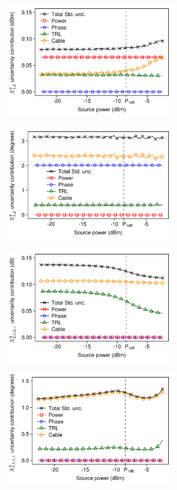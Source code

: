 \documentclass[../thesis/thesis.tex]{subfiles}
\begin{document}
\begin{figure}
	\centering
	\begin{subfigure}{0.45\textwidth}
		\includegraphics[width=\linewidth,height=5cm]{fig5a}			
		\label{ch5_fig_fb12magsens}
	\end{subfigure}\hfil%
	\begin{subfigure}{0.45\textwidth}
		\includegraphics[width=\linewidth,height=5cm]{fig5b}
		\label{ch5_fig_fb12phasesens}
	\end{subfigure}
	\begin{subfigure}{0.45\textwidth}
		\includegraphics[width=\linewidth,height=5cm]{fig5c}
		\label{ch5_fig_s2121magsens}
	\end{subfigure}\hfil%
	\begin{subfigure}{0.45\textwidth}
		\includegraphics[width=\linewidth,height=5cm]{fig5d}	

\end{subfigure}
\end{figure}
\end{document}
